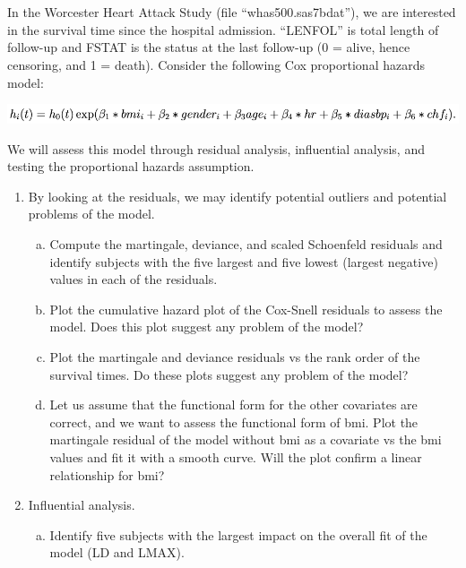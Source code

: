 \documentclass{elegantbook}
\begin{document}
 

\setcounter{chapter}{7}
\chapter{}
\begin{exercise*}[1]
    In the Worcester Heart Attack Study (file “whas500.sas7bdat”), we are interested in the survival time since the hospital admission. “LENFOL” is total length of follow-up and FSTAT is the status at the last follow-up (0 = alive, hence censoring, and 1 = death). Consider the following Cox proportional hazards model: 
    \begin{center}
        \includegraphics[width=.95\textwidth]{Q1.png}
    \end{center}
    We will assess this model through residual analysis, influential analysis, and testing the proportional hazards assumption. 
    \begin{enumerate}
        \item By looking at the residuals, we may identify potential outliers and potential problems of the model.
        \begin{enumerate}[(a)]
            \item Compute the martingale, deviance, and scaled Schoenfeld residuals and identify subjects with the five largest and five lowest (largest negative) values in each of the residuals.
            \item Plot the cumulative hazard plot of the Cox-Snell residuals to assess the model. Does this plot suggest any problem of the model?
            \item Plot the martingale and deviance residuals vs the rank order of the survival times. Do these plots suggest any problem of the model?
            \item Let us assume that the functional form for the other covariates are correct, and we want to assess the functional form of bmi. Plot the martingale residual of the model without bmi as a covariate vs the bmi values and fit it with a smooth curve. Will the plot confirm a linear relationship for bmi?
        \end{enumerate}
        \item Influential analysis. 
        \begin{enumerate}[(a)]
            \item Identify five subjects with the largest impact on the overall fit of the model (LD and LMAX).

\end{enumerate}
\end{enumerate}
\end{exercise*}
\end{document}
